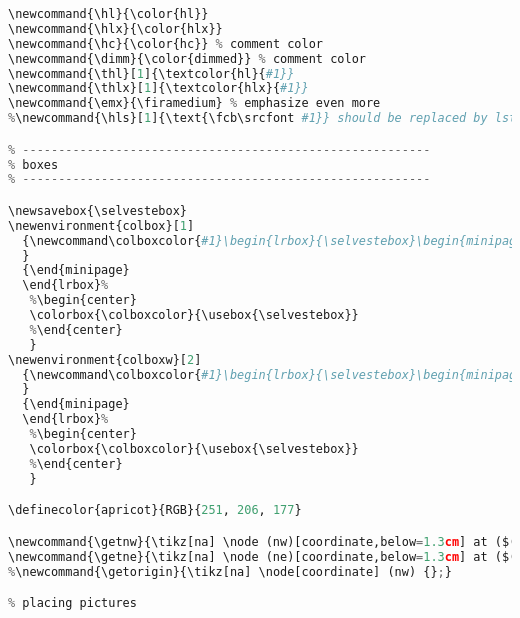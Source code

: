 {\begin{lstlisting}[language=Python,style=normal,escapechar=?,morekeywords={True, False}, mathescape]
% shortcuts for text highlighting
\newcommand{\hl}{\color{hl}}
\newcommand{\hlx}{\color{hlx}}
\newcommand{\hc}{\color{hc}} % comment color
\newcommand{\dimm}{\color{dimmed}} % comment color
\newcommand{\thl}[1]{\textcolor{hl}{#1}}
\newcommand{\thlx}[1]{\textcolor{hlx}{#1}}
\newcommand{\emx}{\firamedium} % emphasize even more
%\newcommand{\hls}[1]{\text{\fcb\srcfont #1}} should be replaced by lstinline

% ---------------------------------------------------------
% boxes
% ---------------------------------------------------------

\newsavebox{\selvestebox}
\newenvironment{colbox}[1]
  {\newcommand\colboxcolor{#1}\begin{lrbox}{\selvestebox}\begin{minipage}[t]{\dimexpr\columnwidth-2\fboxsep\relax}{}
  }
  {\end{minipage}
  \end{lrbox}%
   %\begin{center}
   \colorbox{\colboxcolor}{\usebox{\selvestebox}}
   %\end{center}
   }
\newenvironment{colboxw}[2]
  {\newcommand\colboxcolor{#1}\begin{lrbox}{\selvestebox}\begin{minipage}[t]{#2}{}
  }
  {\end{minipage}
  \end{lrbox}%
   %\begin{center}
   \colorbox{\colboxcolor}{\usebox{\selvestebox}}
   %\end{center}
   }

\definecolor{apricot}{RGB}{251, 206, 177}

\newcommand{\getnw}{\tikz[na] \node (nw)[coordinate,below=1.3cm] at ($(current page.north west)$) {};}
\newcommand{\getne}{\tikz[na] \node (ne)[coordinate,below=1.3cm] at ($(current page.north east)$) {};}
%\newcommand{\getorigin}{\tikz[na] \node[coordinate] (nw) {};}

% placing pictures


\end{lstlisting}}
